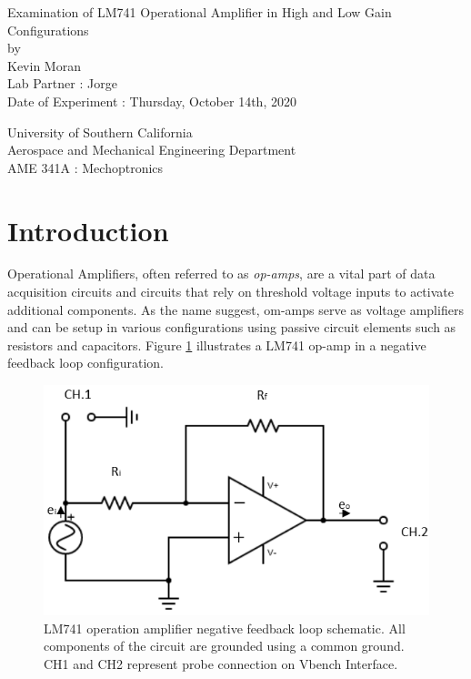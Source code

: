\documentclass[letterpaper,12pt]{article}
\begin{document}
\begin{titlepage}
 \begin{center}
 \vspace*{1in}
{\Huge Examination of LM741 Operational Amplifier in High and Low Gain Configurations}\\
    \bigskip
    by\\
    \bigskip
    {\Large Kevin Moran} \\
    \bigskip
    Lab Partner : Jorge\\
    Date of Experiment : Thursday, October 14th, 2020

    \bigskip\bigskip\bigskip
    University of Southern California\\
    Aerospace and Mechanical Engineering Department\\
    AME 341A : Mechoptronics
 \end{center}
\end{titlepage}




\section{Introduction}
Operational Amplifiers, often referred to as \textit{op-amps}, are a vital part of data acquisition circuits and circuits that rely on threshold voltage inputs to activate additional components. As the name suggest, om-amps serve as voltage amplifiers and can be setup in various configurations using passive circuit elements such as resistors and capacitors. Figure \ref{NFL} illustrates a LM741 op-amp in a negative feedback loop configuration.

\begin{figure}[ht]
    \centering
    \includegraphics[scale=1.25]{feedback.png}
    \caption{\small LM741 operation amplifier negative feedback loop schematic. All components of the circuit are grounded using a common ground. CH1 and CH2 represent probe connection on Vbench Interface.}
    \label{NFL}
\end{figure}
\end{document}
